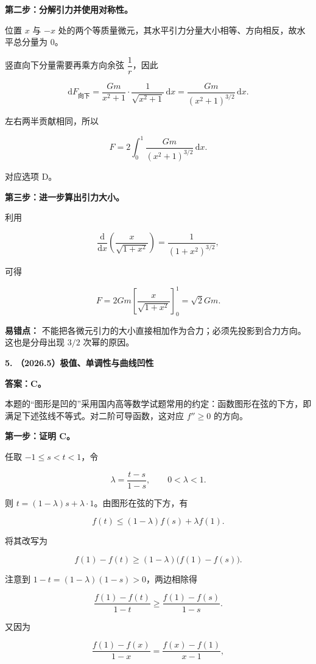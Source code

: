 \documentclass[UTF8,11pt,fontset=windows]{ctexart}
\begin{document}
\textbf{第二步：分解引力并使用对称性。}

位置 $x$ 与 $-x$ 处的两个等质量微元，其水平引力分量大小相等、方向相反，故水平总分量为 $0$。

竖直向下分量需要再乘方向余弦 $\dfrac1r$，因此

$$
\mathrm{d}F_{\text{向下}}
=\frac{Gm}{x^2+1}\cdot\frac1{\sqrt{x^2+1}}\,\mathrm{d}x
=\frac{Gm}{(x^2+1)^{3/2}}\,\mathrm{d}x.
$$

左右两半贡献相同，所以

$$
F=2\int_0^1\frac{Gm}{(x^2+1)^{3/2}}\,\mathrm{d}x.
$$

对应选项 D。

\textbf{第三步：进一步算出引力大小。}

利用

$$
\frac{\mathrm{d}}{\mathrm{d}x}\left(\frac{x}{\sqrt{1+x^2}}\right)
=\frac1{(1+x^2)^{3/2}},
$$

可得

$$
F=2Gm\left[\frac{x}{\sqrt{1+x^2}}\right]_0^1=\sqrt2Gm.
$$

\textbf{易错点：} 不能把各微元引力的大小直接相加作为合力；必须先投影到合力方向。这也是分母出现 $3/2$ 次幂的原因。

\clearpage

\textbf{5. （2026.5）极值、单调性与曲线凹性}

\textbf{答案：C。}

本题的“图形是凹的”采用国内高等数学试题常用的约定：函数图形在弦的下方，即满足下述弦线不等式。对二阶可导函数，这对应 $f''\ge0$ 的方向。

\textbf{第一步：证明 C。}

任取 $-1\le s<t<1$，令

$$
\lambda=\frac{t-s}{1-s},\qquad 0<\lambda<1.
$$

则 $t=(1-\lambda)s+\lambda\cdot1$。由图形在弦的下方，有

$$
f(t)\le(1-\lambda)f(s)+\lambda f(1).
$$

将其改写为

$$
f(1)-f(t)\ge(1-\lambda)\bigl(f(1)-f(s)\bigr).
$$

注意到 $1-t=(1-\lambda)(1-s)>0$，两边相除得

$$
\frac{f(1)-f(t)}{1-t}\ge\frac{f(1)-f(s)}{1-s}.
$$

又因为

$$
\frac{f(1)-f(x)}{1-x}=\frac{f(x)-f(1)}{x-1},
$$
\end{document}
